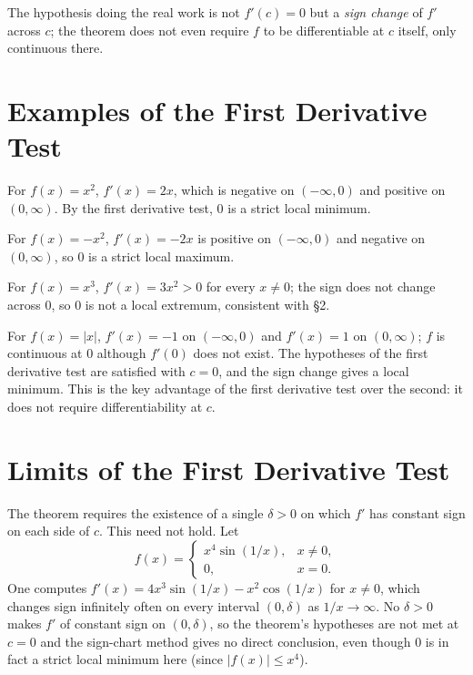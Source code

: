 \documentclass{essay}
\begin{document}
The hypothesis doing the real work is not \(f'(c)=0\) but a \emph{sign
change} of \(f'\) across \(c\); the theorem does not even require \(f\) to
be differentiable at \(c\) itself, only continuous there.

\section{Examples of the First Derivative Test}

\begin{example}
For \(f(x)=x^2\), \(f'(x)=2x\), which is negative on \((-\infty,0)\) and
positive on \((0,\infty)\). By the first derivative test, \(0\) is a strict
local minimum.
\end{example}

\begin{example}
For \(f(x)=-x^2\), \(f'(x)=-2x\) is positive on \((-\infty,0)\) and negative
on \((0,\infty)\), so \(0\) is a strict local maximum.
\end{example}

\begin{example}
For \(f(x)=x^3\), \(f'(x)=3x^2>0\) for every \(x\neq 0\); the sign does not
change across \(0\), so \(0\) is not a local extremum, consistent with
\S 2.
\end{example}

\begin{example}
For \(f(x)=|x|\), \(f'(x)=-1\) on \((-\infty,0)\) and \(f'(x)=1\) on
\((0,\infty)\); \(f\) is continuous at \(0\) although \(f'(0)\) does not
exist. The hypotheses of the first derivative test are satisfied with
\(c=0\), and the sign change gives a local minimum. This is the key
advantage of the first derivative test over the second: it does not require
differentiability at \(c\).
\end{example}

\section{Limits of the First Derivative Test}

\begin{remark}
The theorem requires the existence of a single \(\delta>0\) on which \(f'\)
has constant sign on each side of \(c\). This need not hold. Let
\[
f(x)=\begin{cases} x^4\sin(1/x), & x\neq 0,\\ 0, & x=0.\end{cases}
\]
One computes \(f'(x)=4x^3\sin(1/x)-x^2\cos(1/x)\) for \(x\neq0\), which
changes sign infinitely often on every interval \((0,\delta)\) as
\(1/x\to\infty\). No \(\delta>0\) makes \(f'\) of constant sign on
\((0,\delta)\), so the theorem's hypotheses are not met at \(c=0\) and the
sign-chart method gives no direct conclusion, even though \(0\) is in fact
a strict local minimum here (since \(|f(x)|\le x^4\)).
\end{remark}
\end{document}
